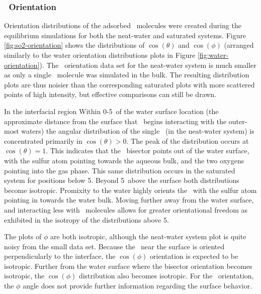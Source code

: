 \subsubsection{\suldiox~Orientation}

Orientation distributions of the adsorbed \suldiox~molecules were created during the equilibrium simulations for both the neat-water and saturated systems. Figure \ref{fig:so2-orientation} shows the distributions of $\cos(\theta)$ and $\cos(\phi)$ (arranged similarly to the water orientation distributions plots in Figure \ref{fig:water-orientation}). The \suldiox~orientation data set for the neat-water system is much smaller as only a single \suldiox~molecule was simulated in the bulk. The resulting distribution plots are thus noisier than the corresponding saturated plots with more scattered points of high intensity, but effective comparisons can still be drawn.

In the interfacial region Within 0-5\angs~of the water surface location (the approximate distance from the surface that \suldiox~begins interacting with the outer-most waters) the angular distribution of the single \suldiox~(in the neat-water system) is concentrated primarily in $\cos(\theta)>0$. The peak of the distribution occurs at $\cos(\theta)=1$. This indicates that the \suldiox~bisector points out of the water surface, with the sulfur atom pointing towards the aqueous bulk, and the two oxygens pointing into the gas phase. This same distribution occurs in the saturated system for positions below 5\angs. Beyond 5\angs~above the surface both distributions become isotropic. Promixity to the water highly orients the \suldiox~with the sulfur atom pointing in towards the water bulk. Moving further away from the water surface, and interacting less with \wat~molecules allows for greater orientational freedom as exhibited in the isotropy of the distributions above 5\angs. %

The plots of $\phi$ are both isotropic, although the neat-water system plot is quite noisy from the small data set. Because the \suldiox~near the surface is oriented perpendicularly to the interface, the $\cos(\phi)$ orientation is expected to be isotropic. Further from the water surface where the bisector orientation becomes isotropic, the $\cos(\phi)$ distribution also becomes isotropic. For the \suldiox~orientation, the $\phi$ angle does not provide further information regarding the surface behavior.

